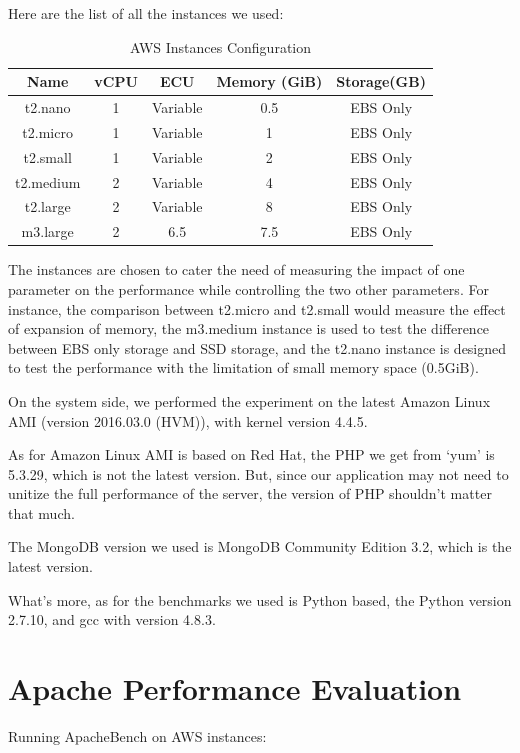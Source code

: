 \documentclass[10pt,letterpaper]{article}
\begin{document}
Here are the list of all the instances we used:
\begin{table}[h!]
\begin{center}
\begin{tabular}{| c || c | c | c | c |}
 \hline
 Name & vCPU & ECU & Memory (GiB) & Storage(GB)\\
 \hline
 t2.nano & 1 & Variable & 0.5 & EBS Only\\ 
 \hline
 t2.micro & 1 & Variable & 1 & EBS Only\\
 \hline
 t2.small & 1 & Variable & 2 & EBS Only\\ 
 \hline
 t2.medium & 2 & Variable & 4 & EBS Only\\
 \hline 
 t2.large & 2 & Variable & 8 & EBS Only\\
 \hline 
 m3.large & 2 & 6.5 & 7.5 & EBS Only\\
 \hline
\end{tabular}
\caption {AWS Instances Configuration}
\end{center}
\end{table}

The instances are chosen to cater the need of measuring the impact of one parameter on the performance while controlling the two other parameters. For instance, the comparison between t2.micro and t2.small would measure the effect of expansion of memory, the m3.medium instance is used to test the difference between EBS only storage and SSD storage, and the t2.nano instance is designed to test the performance with the limitation of small memory space (0.5GiB).

On the system side, we performed the experiment on the latest Amazon Linux AMI (version 2016.03.0 (HVM)), with kernel version 4.4.5. 

As for Amazon Linux AMI is based on Red Hat, the PHP we get from ‘yum’ is 5.3.29, which is not the latest version. But, since our application may not need to unitize the full performance of the server, the version of PHP shouldn’t matter that much.

The MongoDB version we used is  MongoDB Community Edition 3.2, which is the latest version. 

What’s more, as for the benchmarks we used is Python based, the Python version 2.7.10, and gcc with version 4.8.3. 


\section{Apache Performance Evaluation}
Running ApacheBench on AWS instances:
\end{document}
